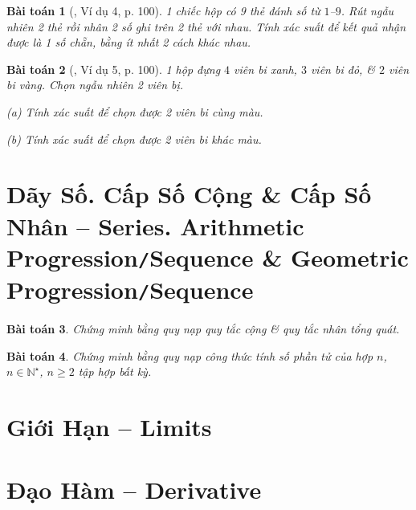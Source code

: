 \documentclass{article}
\numberwithin{equation}{section}
\newtheorem{baitoan}{Bài toán}[section]
\begin{document}
\begin{baitoan}[\cite{TL_chuyen_Toan_Dai_So_Giai_Tich_11}, Ví dụ 4, p. 100]
	1 chiếc hộp có 9 thẻ đánh số từ $1$--$9$. Rút ngẫu nhiên 2 thẻ rồi nhân 2 số ghi trên 2 thẻ với nhau. Tính xác suất để kết quả nhận được là 1 số chẵn, bằng ít nhất 2 cách khác nhau.
\end{baitoan}

\begin{baitoan}[\cite{TL_chuyen_Toan_Dai_So_Giai_Tich_11}, Ví dụ 5, p. 100]
	1 hộp đựng $4$ viên bi xanh, $3$ viên bi đỏ, \& $2$ viên bi vàng. Chọn ngẫu nhiên 2 viên bị.
	\begin{enumerate*}
		\item[(a)] Tính xác suất để chọn được 2 viên bi cùng màu.
		\item[(b)] Tính xác suất để chọn được 2 viên bi khác màu.
	\end{enumerate*}
\end{baitoan}


\section{Dãy Số. Cấp Số Cộng \& Cấp Số Nhân -- Series. Arithmetic Progression\texttt{/}Sequence \& Geometric Progression\texttt{/}Sequence}

\begin{baitoan}
	Chứng minh bằng quy nạp quy tắc cộng \& quy tắc nhân tổng quát.
\end{baitoan}

\begin{baitoan}
	Chứng minh bằng quy nạp công thức tính số phần tử của hợp $n$, $n\in\mathbb{N}^\star$, $n\ge 2$ tập hợp bất kỳ.
\end{baitoan}


\section{Giới Hạn -- Limits}


\section{Đạo Hàm -- Derivative}
\end{document}
